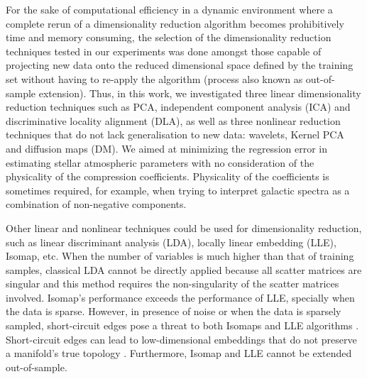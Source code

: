 \documentclass[a4paper,fleqn,usenatbib]{mnras}
\begin{document}
For the sake of computational efficiency in a dynamic environment
where a complete rerun of a dimensionality reduction algorithm becomes
prohibitively time and memory consuming, the selection of the dimensionality
reduction techniques tested in our experiments was done amongst those
capable of projecting new data onto the reduced dimensional space
defined by the training set without having to re-apply the algorithm
(process also known as out-of-sample extension). Thus, in this work,
we investigated three linear dimensionality reduction techniques such
as PCA, independent component analysis (ICA) and discriminative
locality alignment (DLA), as well as three nonlinear reduction
techniques that do not lack generalisation to new data: wavelets,
Kernel PCA and diffusion maps (DM).  We aimed at minimizing the
regression error in estimating stellar atmospheric parameters with no
consideration of the physicality of the compression
coefficients. Physicality of the coefficients is sometimes required,
for example, when trying to interpret galactic spectra as a
combination of non-negative components.

Other linear and nonlinear techniques could be used for dimensionality
reduction, such as linear discriminant analysis (LDA), locally linear
embedding (LLE), Isomap, etc. When the number of variables is much
higher than that of training samples, classical LDA cannot be directly
applied because all scatter matrices are singular and this method
requires the non-singularity of the scatter matrices involved.
Isomap's performance exceeds the performance of LLE, specially when
the data is sparse. However, in presence of noise or when the data is
sparsely sampled, short-circuit edges pose a threat to both Isomaps
and LLE algorithms \citep{saxena:04}. Short-circuit edges can lead to
low-dimensional embeddings that do not preserve a manifold's true
topology \citep{balasubramanianISOMAP:02}. Furthermore, Isomap and LLE
cannot be extended out-of-sample. 

\end{document}
